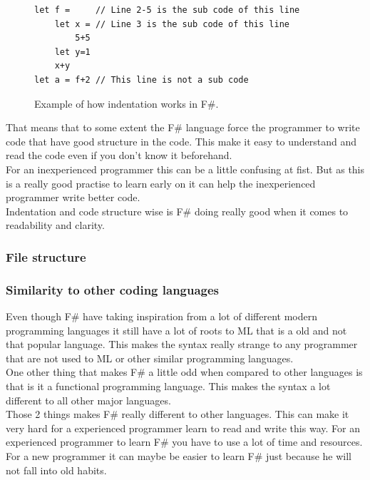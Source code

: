 \documentclass[12pt, a4paper]{article}
\begin{document}
\begin{figure}[!h]
	\begin{lstlisting}
let f = 	// Line 2-5 is the sub code of this line
	let x = // Line 3 is the sub code of this line
		5+5	
	let y=1
  	x+y
let a = f+2	// This line is not a sub code
	\end{lstlisting}
	\caption{Example of how indentation works in F\#.}
	\label{fig:indentationExample}
\end{figure}

That means that to some extent the F\# language force the programmer to write code that have good structure in the code. This make it easy to understand and read the code even if you don't know it beforehand.\\

For an inexperienced programmer this can be a little confusing at fist. But as this is a really good practise to learn early on it can help the inexperienced programmer write better code.\\

Indentation and code structure wise is F\# doing really good when it comes to readability and clarity.

\subsubsection{File structure}

\newpage
\subsubsection{Similarity to other coding languages}

Even though F\# have taking inspiration from a lot of different modern programming languages it still have a lot of roots to ML that is a old and not that popular language. This makes the syntax really strange to any programmer that are not used to ML or other similar programming languages.\\

One other thing that makes F\# a little odd when compared to other languages is that is it a functional programming language. This makes the syntax a lot different to all other major languages.\\

Those 2 things makes F\# really different to other languages. This can make it very hard for a experienced programmer learn to read and write this way. For an experienced programmer to learn F\# you have to use a lot of time and resources. For a new programmer it can maybe be easier to learn F\# just because he will not fall into old habits.
\end{document}
